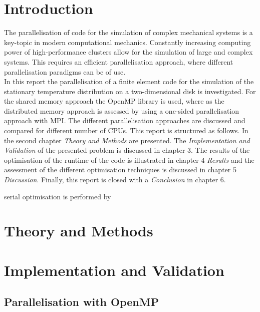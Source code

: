 \documentclass[a4paper, 11pt, oneside]{scrartcl}
\begin{document}



\mabstract{\blindtext}

\section{Introduction}


The parallelisation of code for the simulation of complex mechanical systems is a key-topic in modern computational mechanics. Constantly increasing computing power of high-performance clusters allow for the simulation of large and complex systems. This requires an efficient parallelisation approach, where different parallelisation paradigms can be of use. \\

In this report the parallelisation of a finite element code for the simulation of the stationary temperature distribution on a two-dimensional disk is investigated. For the shared memory approach the OpenMP library is used, where as the distributed memory approach is assessed by using a one-sided parallelisation approach with MPI. The different parallelisation approaches are discussed and compared for different number of CPUs. This report is structured as follows. In the second chapter \textit{Theory and Methods} are presented. The \textit{Implementation and Validation} of the presented problem is discussed in chapter 3. The results of the optimisation of the runtime of the code is illustrated in chapter 4 \textit{Results} and the assessment of the different optimisation techniques is discussed in chapter 5 \textit{Discussion}. Finally, this report is closed with a \textit{Conclusion} in chapter 6.

serial optimisation is performed by  

\section{Theory and Methods}

\section{Implementation and Validation}

\subsection*{Parallelisation with OpenMP}
\end{document}

